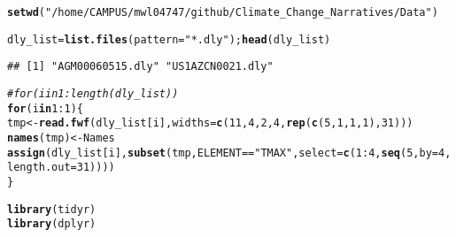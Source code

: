 \documentclass{article}\usepackage[]{graphicx}\usepackage[]{color}
\makeatletter
\newcommand{\hlnum}[1]{\textcolor[rgb]{0.686,0.059,0.569}{#1}}%
\newcommand{\hlstr}[1]{\textcolor[rgb]{0.192,0.494,0.8}{#1}}%
\newcommand{\hlcom}[1]{\textcolor[rgb]{0.678,0.584,0.686}{\textit{#1}}}%
\newcommand{\hlopt}[1]{\textcolor[rgb]{0,0,0}{#1}}%
\newcommand{\hlstd}[1]{\textcolor[rgb]{0.345,0.345,0.345}{#1}}%
\newcommand{\hlkwa}[1]{\textcolor[rgb]{0.161,0.373,0.58}{\textbf{#1}}}%
\newcommand{\hlkwb}[1]{\textcolor[rgb]{0.69,0.353,0.396}{#1}}%
\newcommand{\hlkwc}[1]{\textcolor[rgb]{0.333,0.667,0.333}{#1}}%
\newcommand{\hlkwd}[1]{\textcolor[rgb]{0.737,0.353,0.396}{\textbf{#1}}}%
\newenvironment{kframe}{%
 \def\at@end@of@kframe{}%
 \ifinner\ifhmode%
  \def\at@end@of@kframe{\end{minipage}}%
  \begin{minipage}{\columnwidth}%
 \fi\fi%
 \def\FrameCommand##1{\hskip\@totalleftmargin \hskip-\fboxsep
 \colorbox{shadecolor}{##1}\hskip-\fboxsep
     \hskip-\linewidth \hskip-\@totalleftmargin \hskip\columnwidth}%
 \MakeFramed {\advance\hsize-\width
   \@totalleftmargin\z@ \linewidth\hsize
   \@setminipage}}%
 {\par\unskip\endMakeFramed%
 \at@end@of@kframe}
\newenvironment{knitrout}{}{} %
\makeatother
\begin{document}
\begin{knitrout}
\color{fgcolor}\begin{kframe}
\begin{alltt}
\hlkwd{setwd}\hlstd{(}\hlstr{"/home/CAMPUS/mwl04747/github/Climate_Change_Narratives/Data"}\hlstd{)}

\hlstd{dly_list} \hlkwb{=} \hlkwd{list.files}\hlstd{(}\hlkwc{pattern}\hlstd{=}\hlstr{"*.dly"}\hlstd{);} \hlkwd{head}\hlstd{(dly_list)}
\end{alltt}
\begin{verbatim}
## [1] "AGM00060515.dly" "US1AZCN0021.dly"
\end{verbatim}
\begin{alltt}
\hlcom{#for (i in 1:length(dly_list)) }
\hlkwa{for} \hlstd{(i} \hlkwa{in} \hlnum{1}\hlopt{:}\hlnum{1}\hlstd{)\{}
\hlstd{tmp} \hlkwb{<-} \hlkwd{read.fwf}\hlstd{(dly_list[i],} \hlkwc{widths} \hlstd{=} \hlkwd{c}\hlstd{(}\hlnum{11}\hlstd{,} \hlnum{4}\hlstd{,} \hlnum{2}\hlstd{,} \hlnum{4}\hlstd{,} \hlkwd{rep}\hlstd{(}\hlkwd{c}\hlstd{(}\hlnum{5}\hlstd{,} \hlnum{1}\hlstd{,} \hlnum{1}\hlstd{,} \hlnum{1}\hlstd{),}\hlnum{31}\hlstd{)))}
\hlkwd{names}\hlstd{(tmp)} \hlkwb{<-} \hlstd{Names}
\hlkwd{assign}\hlstd{(dly_list[i],} \hlkwd{subset}\hlstd{(tmp, ELEMENT}\hlopt{==}\hlstr{"TMAX"}\hlstd{,} \hlkwc{select}\hlstd{=}\hlkwd{c}\hlstd{(}\hlnum{1}\hlopt{:}\hlnum{4}\hlstd{,} \hlkwd{seq}\hlstd{(}\hlnum{5}\hlstd{,} \hlkwc{by} \hlstd{=} \hlnum{4}\hlstd{,} \hlkwc{length.out}\hlstd{=}\hlnum{31}\hlstd{))))}
\hlstd{\}}

\hlkwd{library}\hlstd{(tidyr)}
\hlkwd{library}\hlstd{(dplyr)}
\end{alltt}



\end{kframe}
\end{knitrout}
\end{document}
